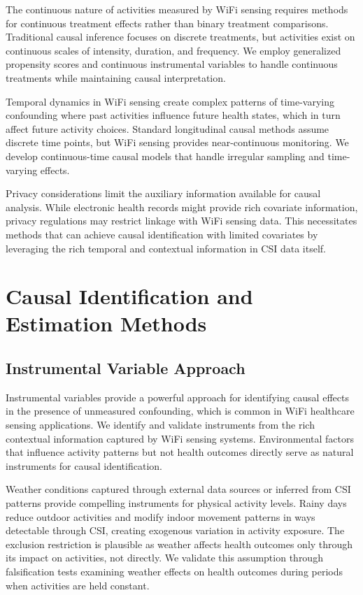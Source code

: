 \documentclass[journal]{IEEEtran}
\begin{document}
The continuous nature of activities measured by WiFi sensing requires methods for continuous treatment effects rather than binary treatment comparisons. Traditional causal inference focuses on discrete treatments, but activities exist on continuous scales of intensity, duration, and frequency. We employ generalized propensity scores and continuous instrumental variables to handle continuous treatments while maintaining causal interpretation.

Temporal dynamics in WiFi sensing create complex patterns of time-varying confounding where past activities influence future health states, which in turn affect future activity choices. Standard longitudinal causal methods assume discrete time points, but WiFi sensing provides near-continuous monitoring. We develop continuous-time causal models that handle irregular sampling and time-varying effects.

Privacy considerations limit the auxiliary information available for causal analysis. While electronic health records might provide rich covariate information, privacy regulations may restrict linkage with WiFi sensing data. This necessitates methods that can achieve causal identification with limited covariates by leveraging the rich temporal and contextual information in CSI data itself.

\section{Causal Identification and Estimation Methods}

\subsection{Instrumental Variable Approach}

Instrumental variables provide a powerful approach for identifying causal effects in the presence of unmeasured confounding, which is common in WiFi healthcare sensing applications. We identify and validate instruments from the rich contextual information captured by WiFi sensing systems. Environmental factors that influence activity patterns but not health outcomes directly serve as natural instruments for causal identification.

Weather conditions captured through external data sources or inferred from CSI patterns provide compelling instruments for physical activity levels. Rainy days reduce outdoor activities and modify indoor movement patterns in ways detectable through CSI, creating exogenous variation in activity exposure. The exclusion restriction is plausible as weather affects health outcomes only through its impact on activities, not directly. We validate this assumption through falsification tests examining weather effects on health outcomes during periods when activities are held constant.
\end{document}
